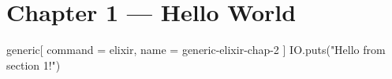 \documentclass[../example.tex]{subfiles}
\def\exopts{
    command = elixir,
    name    = generic-elixir-chap-2
}
\begin{document}
\section{Chapter 1 — Hello World}

\begin{sciffi}{generic}[\exopts]
  IO.puts("Hello from section 1!")
\end{sciffi}
\end{document}
